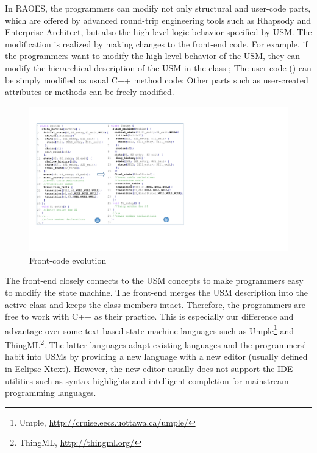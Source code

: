 In RAOES, the programmers can modify not only structural and user-code parts, which are offered by advanced round-trip engineering tools such as Rhapsody and Enterprise Architect, but also the high-level logic behavior specified by USM.
The modification is realized by making changes to the front-end code.
For example, if the programmers want to modify the high level behavior of the USM, they can modify the hierarchical description of the USM in the class ;
The user-code () can be simply modified as usual C++ method code;
Other parts such as user-created attributes or methods can be freely modified.




\begin{figure}
	\centering
	\includegraphics[clip, trim=0.95cm 3.5cm 12.7cm 2.2cm, width=1.08\columnwidth]{figures/frontendoverview.pdf}
	\caption{Front-code evolution} 
	\label{fig:frontend-overview}
\end{figure}



The front-end closely connects to the USM concepts to make programmers easy to modify the state machine.
The front-end merges the USM description into the active class  and keeps the class members intact. 
Therefore, the programmers are free to work with C++ as their practice.
This is especially our difference and advantage over some text-based state machine languages such as Umple\footnote{Umple, \url{http://cruise.eecs.uottawa.ca/umple/}} and ThingML\footnote{ThingML, \url{http://thingml.org/}}.
The latter languages adapt existing languages and the programmers' habit into USMs by providing a new language with a new editor (usually defined in Eclipse Xtext).
However, the new editor usually does not support the IDE utilities such as syntax highlights and intelligent completion for mainstream programming languages. 



